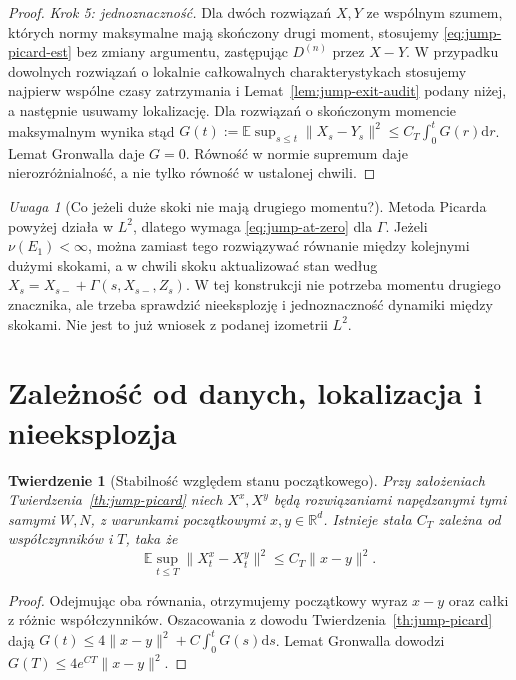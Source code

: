 \documentclass[11pt,a4paper,oneside]{report}
\numberwithin{equation}{chapter}
\theoremstyle{plain}
\newtheorem{twierdzenie}{Twierdzenie}[chapter]
\theoremstyle{definition}
\theoremstyle{remark}
\newtheorem{uwaga}{Uwaga}[chapter]
\newcommand{\R}{\mathbb{R}}
\newcommand{\E}{\mathbb{E}}
\newcommand{\dd}{\mathrm{d}}
\begin{document}
\begin{proof}
\emph{Krok 5: jednoznaczność.} Dla dwóch rozwiązań $X,Y$
ze wspólnym szumem, których normy maksymalne mają skończony
drugi moment, stosujemy \eqref{eq:jump-picard-est}
bez zmiany argumentu, zastępując $D^{(n)}$ przez $X-Y$.
W przypadku dowolnych rozwiązań o lokalnie całkowalnych
charakterystykach stosujemy najpierw wspólne czasy
zatrzymania i Lemat~\ref{lem:jump-exit-audit} podany niżej,
a następnie usuwamy lokalizację. Dla rozwiązań o
skończonym momencie maksymalnym wynika stąd
$G(t):=\E\sup_{s\le t}\|X_s-Y_s\|^2
\le C_T\int_0^tG(r)\dd r$.
Lemat Gronwalla daje $G=0$. Równość w normie supremum
daje nierozróżnialność, a nie tylko równość w ustalonej
chwili.
\end{proof}

\begin{uwaga}[Co jeżeli duże skoki nie mają drugiego momentu?]
Metoda Picarda powyżej działa w $L^2$, dlatego wymaga
\eqref{eq:jump-at-zero} dla $\Gamma$. Jeżeli $\nu(E_1)<\infty$,
można zamiast tego rozwiązywać równanie między kolejnymi dużymi
skokami, a w chwili skoku aktualizować stan według
$X_s=X_{s-}+\Gamma(s,X_{s-},Z_s)$. W tej konstrukcji
nie potrzeba momentu drugiego znacznika, ale trzeba
sprawdzić nieeksplozję i jednoznaczność dynamiki między
skokami. Nie jest to już wniosek z podanej izometrii $L^2$.
\end{uwaga}

\section{Zależność od danych, lokalizacja i nieeksplozja}\label{sec:volIII:13:04}

\begin{twierdzenie}[Stabilność względem stanu początkowego]\label{thm:volIII:13:02}
\label{th:jump-stability}
Przy założeniach Twierdzenia~\ref{th:jump-picard} niech
$X^x,X^y$ będą rozwiązaniami napędzanymi tymi samymi
$W,N$, z warunkami początkowymi $x,y\in\R^d$.
Istnieje stała $C_T$ zależna od współczynników i $T$, taka że
\[
 \E\sup_{t\le T}\|X_t^x-X_t^y\|^2\le C_T\|x-y\|^2.
 \tag{13.7}\label{eq:jump-stability}
\]
\end{twierdzenie}
\begin{proof}
Odejmując oba równania, otrzymujemy początkowy wyraz
$x-y$ oraz całki z różnic współczynników. Oszacowania
z dowodu Twierdzenia~\ref{th:jump-picard} dają
$G(t)\le4\|x-y\|^2+C\int_0^tG(s)\dd s$.
Lemat Gronwalla dowodzi $G(T)\le4e^{CT}\|x-y\|^2$.
\end{proof}
\end{document}
